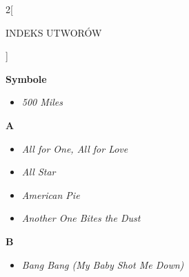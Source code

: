 \documentclass[a4paper]{report}
\begin{document}
\begin{multicols*}{2}[\begin{Huge}INDEKS UTWORÓW\end{Huge}\vspace{1cm}]\begin{minipage}{\columnwidth}
	\begin{Large}
		\textbf{Symbole}
	\end{Large} 
	\begin{itemize}[topsep=6pt, after=\vspace{5mm}, leftmargin=0mm]
		\itemsep0em
		\item[]\textit{500 Miles}  \\
	\end{itemize}
\end{minipage}
\begin{minipage}{\columnwidth}
\begin{Large}
		\textbf{A}
	\end{Large} 
	\begin{itemize}[topsep=6pt, after=\vspace{1.5mm}, leftmargin=0mm]
		\itemsep0em
		\item[]\textit{All for One, All for Love}  \\
		\item[]  \textit{All Star}  \\
	\end{itemize}
\end{minipage}
\begin{minipage}{\columnwidth}
	\begin{itemize}[topsep=6pt, after=\vspace{5mm}, leftmargin=0mm]
		\itemsep0em
		\item[]  \textit{American Pie}  \\
		\item[]  \textit{Another One Bites the Dust}  \\
	\end{itemize}
\end{minipage}
\begin{minipage}{\columnwidth}
\begin{Large}
		\textbf{B}
	\end{Large} 
	\begin{itemize}[topsep=6pt, after=\vspace{5mm}, leftmargin=0mm]
		\itemsep0em
		\item[]\textit{Bang Bang (My Baby Shot Me Down)}  \\

\end{itemize}
\end{minipage}
\end{multicols*}
\end{document}
